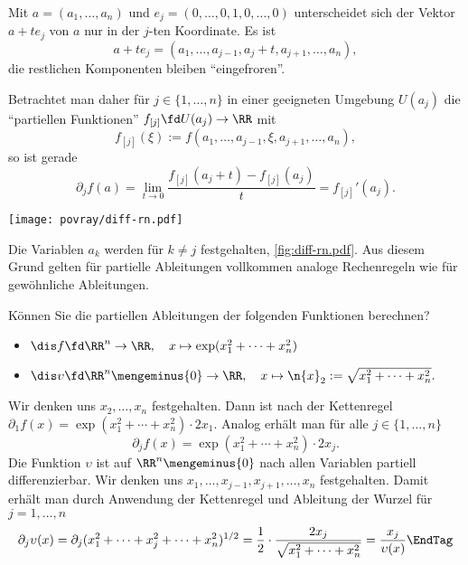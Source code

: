 \begin{antwort}[]%
  \noindent\Ant 
  Mit $a=(a_1,\ldots,a_n)$ und $e_j = (0,\ldots,0,1,0,\ldots,0)$ unterscheidet 
  sich der Vektor $a+te_j$ von $a$ nur in der $j$-ten Koordinate. Es ist
  \[
  a+te_j = (a_1, \ldots, a_{j-1}, a_j+t, a_{j+1}, \ldots, a_n ),
  \]
  die restlichen Komponenten bleiben "`eingefroren"'. 

  Betrachtet man daher 
  für $j\in \{ 1,\ldots, n \}$ in  einer geeigneten Umgebung $U(a_j)$ die 
  "`partiellen Funktionen"' $f_{[j]}\fd U(a_j)\to \RR$ mit 
  \[
  f_{[j]} (\xi) := f(a_1,\ldots,a_{j-1}, \xi, a_{j+1},\ldots, a_n ),
  \]
  so ist gerade 
  \[
  \partial_j f(a) = \lim_{t\to 0} 
  \frac{ f_{[j]} (a_j+t )-f_{[j]} (a_j)}{ t } = f_{[j]}'(a_j).
  \]

  \begin{center}
    \texttt{[image: povray/diff-rn.pdf]}
    \label{fig:diff-rn.pdf}
  \end{center}    
  
  Die Variablen $a_k$ werden für $k\not= j$ festgehalten, \sieheAbbildung\ref{fig:diff-rn.pdf}. Aus diesem 
  Grund gelten für partielle Ableitungen vollkommen analoge Rechenregeln 
  wie für gewöhnliche Ableitungen. \AntEnd
\end{antwort}

\begin{frage}\label{10_partbsp}
  Können Sie die partiellen Ableitungen der folgenden Funktionen berechnen?
  \begin{itemize}[2mm]
  \item[\desc{a}] $\dis f\fd \RR^n \to \RR,\quad 
    x \mapsto \exp (x_1^2+\cdots + x_n^2 )$ \\
  \item[\desc{b}] $\dis \upsilon \fd \RR^n \mengeminus \{ 0 \} \to \RR,\quad 
    x \mapsto \n{ x }_2 := \sqrt{ x_1^2+\cdots + x_n^2 }.$ 
  \end{itemize}
\end{frage}

\begin{antwort}
  Wir denken uns $x_2,\ldots, x_n$ festgehalten. Dann ist nach der 
  Kettenregel $\partial_1 f(x) = \exp( x_1^2 + \cdots + x_n^2 )\cdot 2x_1$. 
  Analog erhält man für alle $j\in \{ 1,\ldots, n \}$ 
  \[
  \partial_j f(x) = \exp( x_1^2 + \cdots + x_n^2 )\cdot 2x_j.
  \]
   Die Funktion $\upsilon$ ist auf $\RR^n \mengeminus \{ 0 \}$ 
  nach allen Variablen partiell differenzierbar. Wir denken uns 
  $x_1,\ldots,x_{j-1}, x_{j+1}, \ldots, x_n $ festgehalten. 
  Damit erhält man durch Anwendung der Kettenregel und Ableitung der Wurzel 
  für $j=1,\ldots,n$
  \begin{equation}
    \partial_j \upsilon(x) = 
    \partial_j (x_1^2 + \cdots + x_j^2 + \cdots + x_n^2 )^{1/2} 
    = \frac{1}{2} \cdot \frac{2x_j}{ \sqrt{x_1^2 + \cdots + x_n^2 } }= 
    \frac{x_j}{\upsilon(x)} 
    \EndTag
  \end{equation}
\end{antwort}

